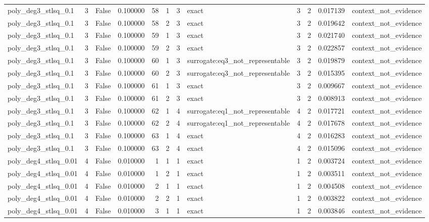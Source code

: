 \begin{tabular}{lrrrrrrlrrrl}
poly\_deg3\_stlsq\_0.1 & 3 & False & 0.100000 & 58 & 1 & 3 & exact & 3 & 2 & 0.017139 & context\_not\_evidence \\
poly\_deg3\_stlsq\_0.1 & 3 & False & 0.100000 & 58 & 2 & 3 & exact & 3 & 2 & 0.019642 & context\_not\_evidence \\
poly\_deg3\_stlsq\_0.1 & 3 & False & 0.100000 & 59 & 1 & 3 & exact & 3 & 2 & 0.021740 & context\_not\_evidence \\
poly\_deg3\_stlsq\_0.1 & 3 & False & 0.100000 & 59 & 2 & 3 & exact & 3 & 2 & 0.022857 & context\_not\_evidence \\
poly\_deg3\_stlsq\_0.1 & 3 & False & 0.100000 & 60 & 1 & 3 & surrogate:eq3\_not\_representable & 3 & 2 & 0.019879 & context\_not\_evidence \\
poly\_deg3\_stlsq\_0.1 & 3 & False & 0.100000 & 60 & 2 & 3 & surrogate:eq3\_not\_representable & 3 & 2 & 0.015395 & context\_not\_evidence \\
poly\_deg3\_stlsq\_0.1 & 3 & False & 0.100000 & 61 & 1 & 3 & exact & 3 & 2 & 0.009667 & context\_not\_evidence \\
poly\_deg3\_stlsq\_0.1 & 3 & False & 0.100000 & 61 & 2 & 3 & exact & 3 & 2 & 0.008913 & context\_not\_evidence \\
poly\_deg3\_stlsq\_0.1 & 3 & False & 0.100000 & 62 & 1 & 4 & surrogate:eq1\_not\_representable & 4 & 2 & 0.017721 & context\_not\_evidence \\
poly\_deg3\_stlsq\_0.1 & 3 & False & 0.100000 & 62 & 2 & 4 & surrogate:eq1\_not\_representable & 4 & 2 & 0.017678 & context\_not\_evidence \\
poly\_deg3\_stlsq\_0.1 & 3 & False & 0.100000 & 63 & 1 & 4 & exact & 4 & 2 & 0.016283 & context\_not\_evidence \\
poly\_deg3\_stlsq\_0.1 & 3 & False & 0.100000 & 63 & 2 & 4 & exact & 4 & 2 & 0.015096 & context\_not\_evidence \\
poly\_deg4\_stlsq\_0.01 & 4 & False & 0.010000 & 1 & 1 & 1 & exact & 1 & 2 & 0.003724 & context\_not\_evidence \\
poly\_deg4\_stlsq\_0.01 & 4 & False & 0.010000 & 1 & 2 & 1 & exact & 1 & 2 & 0.003511 & context\_not\_evidence \\
poly\_deg4\_stlsq\_0.01 & 4 & False & 0.010000 & 2 & 1 & 1 & exact & 1 & 2 & 0.004508 & context\_not\_evidence \\
poly\_deg4\_stlsq\_0.01 & 4 & False & 0.010000 & 2 & 2 & 1 & exact & 1 & 2 & 0.003822 & context\_not\_evidence \\
poly\_deg4\_stlsq\_0.01 & 4 & False & 0.010000 & 3 & 1 & 1 & exact & 1 & 2 & 0.003846 & context\_not\_evidence \\

\end{tabular}
